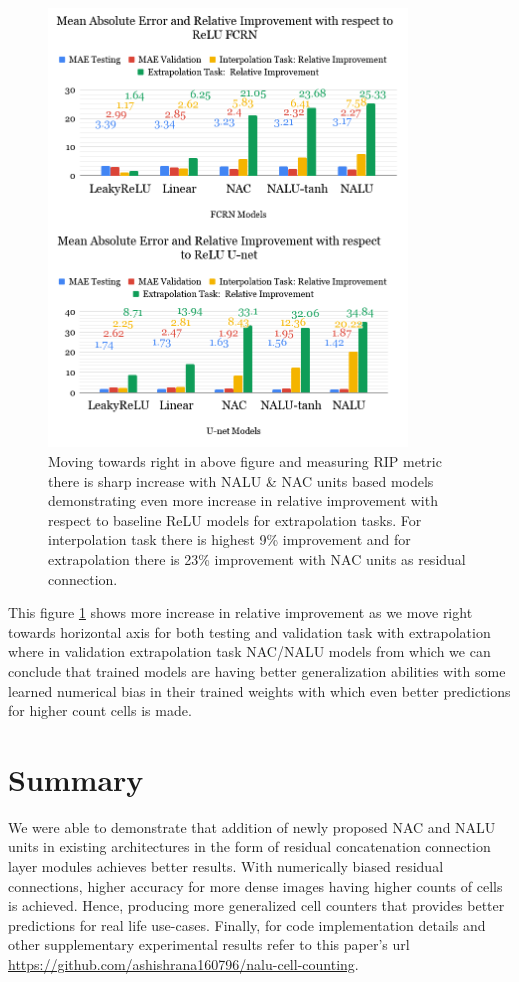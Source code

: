 \documentclass[runningheads]{llncs}
\begin{document}
\begin{figure}[!h]
\centering
\includegraphics[width=0.85\textwidth]{merged-relative-improv-results.png}
\caption{Moving towards right in above figure and measuring RIP metric there is sharp increase with NALU \& NAC units based models demonstrating even more increase in relative improvement with respect to baseline ReLU models for extrapolation tasks. For interpolation task there is highest 9\% improvement and for extrapolation there is 23\% improvement with NAC units as residual connection.}
\label{fig10}
\end{figure}

This figure \ref{fig10} shows more increase in relative improvement as we move right towards horizontal axis for both testing and validation task with extrapolation where in validation extrapolation task NAC/NALU models from which we can conclude that trained models are having better generalization abilities with some learned numerical bias in their trained weights with which even better predictions for higher count cells is made.

\section{Summary}
We were able to demonstrate that addition of newly proposed NAC and NALU units in existing architectures in the form of residual concatenation connection layer modules achieves better results. With numerically biased residual connections, higher accuracy for more dense images having higher counts of cells is achieved. Hence, producing more generalized cell counters that provides better predictions for real life use-cases. Finally, for code implementation details and other supplementary experimental results refer to this paper's url \url{https://github.com/ashishrana160796/nalu-cell-counting}.
\end{document}

